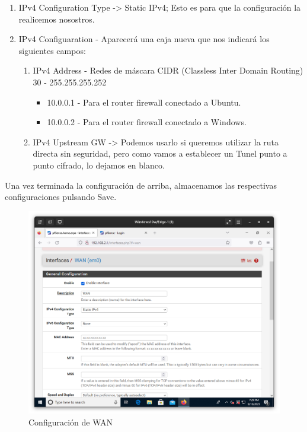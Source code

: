 \begin{enumerate}
    \item IPv4 Configuration Type -> Static IPv4; Esto es para que la configuración la realicemos nosostros.
    \item IPv4 Configuaration - Aparecerá una caja nueva que nos indicará los siguientes campos:
    \begin{enumerate}
        \item IPv4 Address - Redes de máscara CIDR (Classless Inter Domain Routing) 30 - 255.255.255.252
            \begin{itemize}
                \item 10.0.0.1 - Para el router firewall conectado a Ubuntu.
                \item 10.0.0.2 - Para el router firewall conectado a Windows.
            \end{itemize}
        \item IPv4 Upstream GW -> Podemos usarlo si queremos utilizar la ruta directa sin seguridad, pero como vamos a establecer un Tunel punto a punto cifrado, lo dejamos en blanco.
    \end{enumerate}
\end{enumerate}

Una vez terminada la configuración de arriba, almacenamos las respectivas configuraciones pulsando Save.

\begin{figure}[H]
	\centering
	\includegraphics[scale=0.30]{02}
	\caption{Configuración de WAN}
\end{figure}

